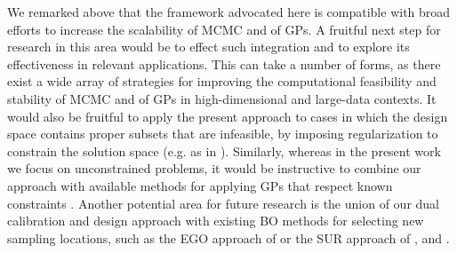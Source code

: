 \documentclass[10pt,a4paper]{article}
\begin{document}
We remarked above that the framework advocated here is compatible with broad efforts to increase the scalability of MCMC and of GPs.
A fruitful next step for research in this area would be to effect such integration and to explore its effectiveness in relevant applications.
This can take a number of forms, as there exist a wide array of strategies for improving the computational feasibility and stability of MCMC and of GPs in high-dimensional and large-data contexts.
It would also be fruitful to apply the present approach to cases in which the design space contains proper subsets that are infeasible, by imposing regularization to constrain the solution space (e.g. as in \cite{Calvetti2014}).
Similarly, whereas in the present work we focus on unconstrained problems, it would be instructive to combine our approach with available methods for applying GPs that respect known constraints \citep{Golchi2015,Wang2016,Maatouk2017,Ding2019}.
Another potential area for future research is the union of our dual calibration and design approach with existing BO methods for selecting new sampling locations, such as the EGO approach of \citet{Jones1998} or the SUR approach of \citet{Vazquez2009}, \citet{Bect2012} and \citet{Chevalier2014}.




	
\end{document}
